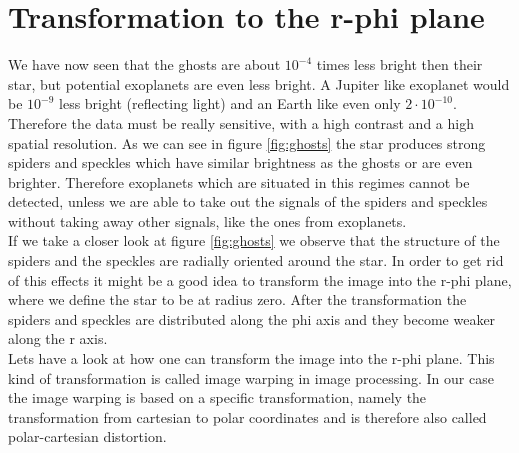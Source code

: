 \section{Transformation to the r-phi plane}
We have now seen that the ghosts are about $10^{-4}$ times less bright then their star, but potential exoplanets are even less bright. A Jupiter like exoplanet would be $10^{-9}$ less bright (reflecting light) and an Earth like even only $2 \cdot 10^{-10}$. Therefore the data must be really sensitive, with a high contrast and a high spatial resolution. As we can see in figure \ref{fig:ghosts} the star produces strong spiders and speckles which have similar brightness as the ghosts or are even brighter. Therefore exoplanets which are situated in this regimes cannot be detected, unless we are able to take out the signals of the spiders and speckles without taking away other signals, like the ones from exoplanets.\\
If we take a closer look at figure \ref{fig:ghosts} we observe that the structure of the spiders and the speckles are radially oriented around the star. In order to get rid of this effects it might be a good idea to transform the image into the r-phi plane, where we define the star to be at radius zero. After the transformation the spiders and speckles are distributed along the phi axis and they become weaker along the r axis.\\
Lets have a look at how one can transform the image into the r-phi plane. This kind of transformation is called image warping in image processing. In our case the image warping is based on a specific transformation, namely the transformation from cartesian to polar coordinates and is therefore also called polar-cartesian distortion.
